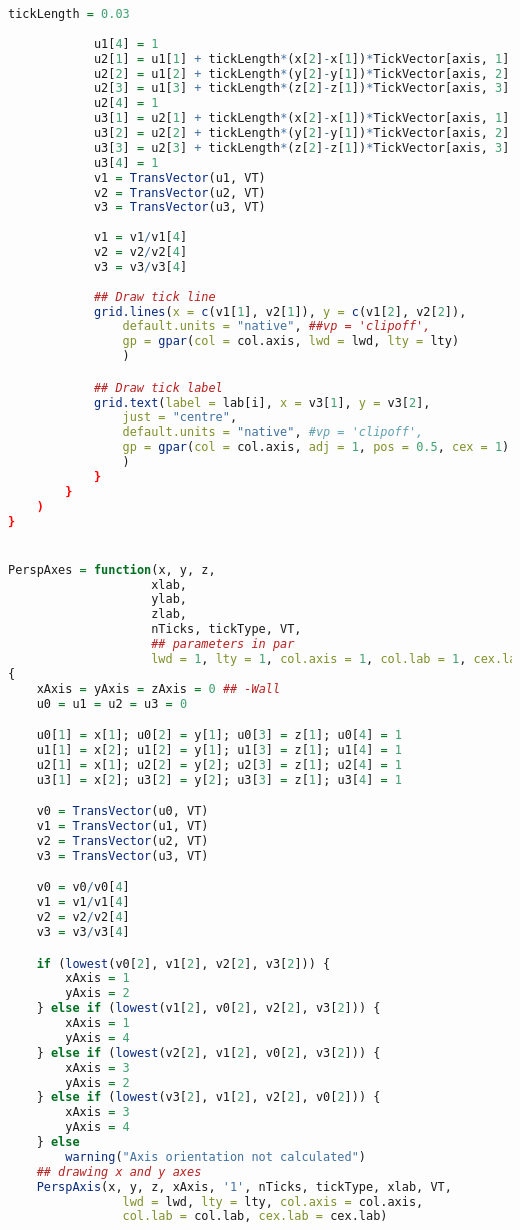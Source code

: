 \begin{lstlisting}[language = R]
            tickLength = 0.03
            
            u1[4] = 1
            u2[1] = u1[1] + tickLength*(x[2]-x[1])*TickVector[axis, 1]
            u2[2] = u1[2] + tickLength*(y[2]-y[1])*TickVector[axis, 2]
            u2[3] = u1[3] + tickLength*(z[2]-z[1])*TickVector[axis, 3]
            u2[4] = 1
            u3[1] = u2[1] + tickLength*(x[2]-x[1])*TickVector[axis, 1]
            u3[2] = u2[2] + tickLength*(y[2]-y[1])*TickVector[axis, 2]
            u3[3] = u2[3] + tickLength*(z[2]-z[1])*TickVector[axis, 3]
            u3[4] = 1
            v1 = TransVector(u1, VT)
            v2 = TransVector(u2, VT)
            v3 = TransVector(u3, VT)
                        
            v1 = v1/v1[4]
            v2 = v2/v2[4]
            v3 = v3/v3[4]
            
            ## Draw tick line
            grid.lines(x = c(v1[1], v2[1]), y = c(v1[2], v2[2]),
                default.units = "native", ##vp = 'clipoff',
                gp = gpar(col = col.axis, lwd = lwd, lty = lty)
                )

            ## Draw tick label
            grid.text(label = lab[i], x = v3[1], y = v3[2],
                just = "centre",
                default.units = "native", #vp = 'clipoff',
                gp = gpar(col = col.axis, adj = 1, pos = 0.5, cex = 1)
                )
            }
        }
    )
}


PerspAxes = function(x, y, z, 
                    xlab, 
                    ylab, 
                    zlab, 
                    nTicks, tickType, VT, 
					## parameters in par
                    lwd = 1, lty = 1, col.axis = 1, col.lab = 1, cex.lab = 1)
{
    xAxis = yAxis = zAxis = 0 ## -Wall 
    u0 = u1 = u2 = u3 = 0

    u0[1] = x[1]; u0[2] = y[1]; u0[3] = z[1]; u0[4] = 1
    u1[1] = x[2]; u1[2] = y[1]; u1[3] = z[1]; u1[4] = 1
    u2[1] = x[1]; u2[2] = y[2]; u2[3] = z[1]; u2[4] = 1
    u3[1] = x[2]; u3[2] = y[2]; u3[3] = z[1]; u3[4] = 1

    v0 = TransVector(u0, VT)
    v1 = TransVector(u1, VT)
    v2 = TransVector(u2, VT)
    v3 = TransVector(u3, VT)

    v0 = v0/v0[4]
    v1 = v1/v1[4]
    v2 = v2/v2[4]
    v3 = v3/v3[4]

    if (lowest(v0[2], v1[2], v2[2], v3[2])) {
        xAxis = 1
        yAxis = 2
    } else if (lowest(v1[2], v0[2], v2[2], v3[2])) {
        xAxis = 1
        yAxis = 4
    } else if (lowest(v2[2], v1[2], v0[2], v3[2])) {
        xAxis = 3
        yAxis = 2
    } else if (lowest(v3[2], v1[2], v2[2], v0[2])) {
        xAxis = 3
        yAxis = 4
    } else
        warning("Axis orientation not calculated")
    ## drawing x and y axes
    PerspAxis(x, y, z, xAxis, '1', nTicks, tickType, xlab, VT, 
                lwd = lwd, lty = lty, col.axis = col.axis, 
                col.lab = col.lab, cex.lab = cex.lab)
                

\end{lstlisting}
